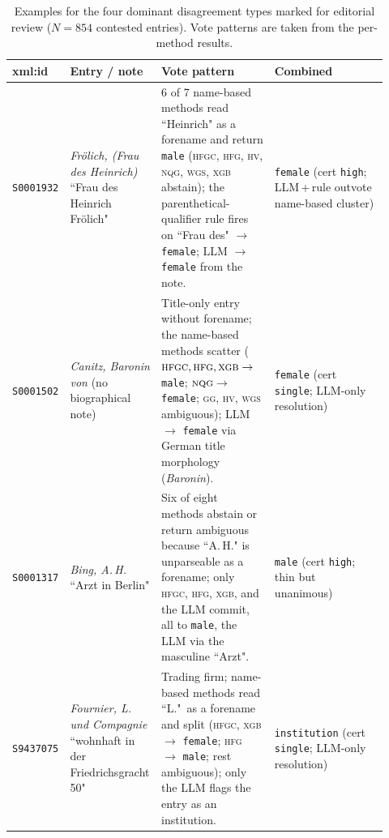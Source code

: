 \documentclass{eceasst}
\begin{document}
\begin{table}[h]
  \centering
  \scriptsize
  \setlength{\tabcolsep}{3pt}
  \begin{tabular}{p{0.10\linewidth} p{0.22\linewidth} p{0.30\linewidth} p{0.30\linewidth}}
    \toprule
    xml:id & Entry / note & Vote pattern & Combined \\
    \midrule
    \texttt{S0001932} &
      \textit{Frölich, (Frau des Heinrich)} \newline
      ``Frau des Heinrich Frölich" &
      6 of 7 name-based methods read ``Heinrich" as a forename and return \texttt{male} (\textsc{hfgc}, \textsc{hfg}, \textsc{hv}, \textsc{nqg}, \textsc{wgs}, \textsc{xgb} abstain); the parenthetical-qualifier rule fires on ``Frau des" $\rightarrow$ \texttt{female}; LLM $\rightarrow$ \texttt{female} from the note. &
      \texttt{female} (cert \texttt{high}; LLM\,+\,rule outvote name-based cluster) \\
    \addlinespace
    \texttt{S0001502} &
      \textit{Canitz, Baronin von} \newline
      (no biographical note) &
      Title-only entry without forename; the name-based methods scatter ($\textsc{hfgc},\textsc{hfg},\textsc{xgb}\rightarrow$ \texttt{male}; $\textsc{nqg}\rightarrow$ \texttt{female}; \textsc{gg}, \textsc{hv}, \textsc{wgs} ambiguous); LLM $\rightarrow$ \texttt{female} via German title morphology (\emph{Baronin}). &
      \texttt{female} (cert \texttt{single}; LLM-only resolution) \\
    \addlinespace
    \texttt{S0001317} &
      \textit{Bing, A.\,H.} \newline
      ``Arzt in Berlin" &
      Six of eight methods abstain or return ambiguous because ``A.\,H." is unparseable as a forename; only \textsc{hfgc}, \textsc{hfg}, \textsc{xgb}, and the LLM commit, all to \texttt{male}, the LLM via the masculine ``Arzt". &
      \texttt{male} (cert \texttt{high}; thin but unanimous) \\
    \addlinespace
    \texttt{S9437075} &
      \textit{Fournier, L. und Compagnie} \newline
      ``wohnhaft in der Friedrichsgracht 50" &
      Trading firm; name-based methods read ``L."~as a forename and split (\textsc{hfgc}, \textsc{xgb} $\rightarrow$ \texttt{female}; \textsc{hfg} $\rightarrow$ \texttt{male}; rest ambiguous); only the LLM flags the entry as an institution. &
      \texttt{institution} (cert \texttt{single}; LLM-only resolution) \\
    \bottomrule
  \end{tabular}
  \caption{Examples for the four dominant disagreement types marked for editorial review ($N = 854$ contested entries). Vote patterns are taken from the per-method results.}
  \label{tab:disagreement-examples}
\end{table}
\end{document}
